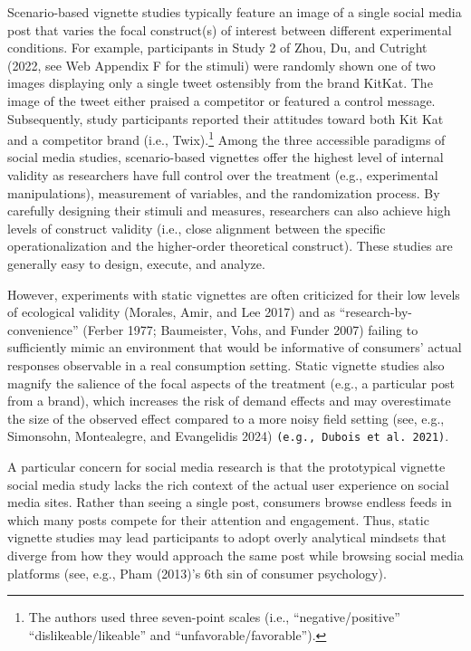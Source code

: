 \documentclass[
  a4paper,
]{scrreprt}
\begin{document}
Scenario-based vignette studies typically feature an image of a single
social media post that varies the focal construct(s) of interest between
different experimental conditions. For example, participants in Study 2
of Zhou, Du, and Cutright (2022, see Web Appendix F for the stimuli)
were randomly shown one of two images displaying only a single tweet
ostensibly from the brand KitKat. The image of the tweet either praised
a competitor or featured a control message. Subsequently, study
participants reported their attitudes toward both Kit Kat and a
competitor brand (i.e., Twix).\footnote{The authors used three
  seven-point scales (i.e., ``negative/positive''
  ``dislikeable/likeable'' and ``unfavorable/favorable'').} Among the
three accessible paradigms of social media studies, scenario-based
vignettes offer the highest level of internal validity as researchers
have full control over the treatment (e.g., experimental manipulations),
measurement of variables, and the randomization process. By carefully
designing their stimuli and measures, researchers can also achieve high
levels of construct validity (i.e., close alignment between the specific
operationalization and the higher-order theoretical construct). These
studies are generally easy to design, execute, and analyze.

However, experiments with static vignettes are often criticized for
their low levels of ecological validity (Morales, Amir, and Lee 2017)
and as ``research-by-convenience'' (Ferber 1977; Baumeister, Vohs, and
Funder 2007) failing to sufficiently mimic an environment that would be
informative of consumers' actual responses observable in a real
consumption setting. Static vignette studies also magnify the salience
of the focal aspects of the treatment (e.g., a particular post from a
brand), which increases the risk of demand effects and may overestimate
the size of the observed effect compared to a more noisy field setting
(see, e.g., Simonsohn, Montealegre, and Evangelidis 2024)
\texttt{(e.g.,\ Dubois\ et\ al.\ 2021)}.

A particular concern for social media research is that the prototypical
vignette social media study lacks the rich context of the actual user
experience on social media sites. Rather than seeing a single post,
consumers browse endless feeds in which many posts compete for their
attention and engagement. Thus, static vignette studies may lead
participants to adopt overly analytical mindsets that diverge from how
they would approach the same post while browsing social media platforms
(see, e.g., Pham (2013)'s 6th sin of consumer psychology).
\end{document}
